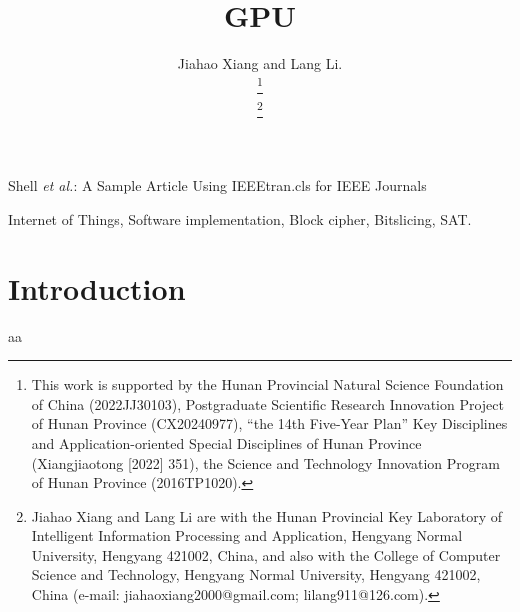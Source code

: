 \documentclass[journal]{IEEEtran}
\begin{document}
\title{GPU}


\author{Jiahao Xiang and Lang Li.

\thanks{This work is supported by the Hunan Provincial Natural Science Foundation of China (2022JJ30103), Postgraduate Scientific Research Innovation Project of Hunan Province (CX20240977), “the 14th Five-Year Plan” Key Disciplines and Application-oriented Special Disciplines of Hunan Province (Xiangjiaotong [2022] 351), the Science and Technology Innovation Program of Hunan Province (2016TP1020).}


\thanks{Jiahao Xiang and Lang Li are with the Hunan Provincial Key Laboratory of Intelligent Information Processing and Application, Hengyang Normal University, Hengyang 421002, China, and also with the College of Computer Science and Technology, Hengyang Normal University, Hengyang 421002, China (e-mail: jiahaoxiang2000@gmail.com; lilang911@126.com).}%
}

%
{Shell \MakeLowercase{\textit{et al.}}: A Sample Article Using IEEEtran.cls for IEEE Journals}

\IEEEpubid{}

\maketitle


\begin{abstract}
   
\end{abstract}

\begin{IEEEkeywords}
  Internet of Things, Software implementation, Block cipher, Bitslicing, SAT.
\end{IEEEkeywords}

\section{Introduction}
\label{sec:intro}

\cite{Adomnicai2020} aa

\end{document}
